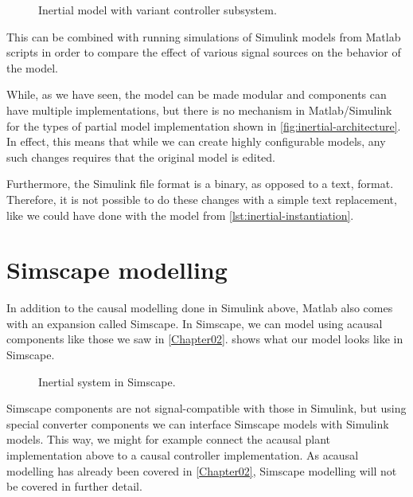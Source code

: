 \documentclass[\rootfolder/main.tex]{subfiles}
\begin{document}
\begin{figure}[ht]
    \centering
    {
        \footnotesize
        
    }
    {
        \footnotesize
        
    }
    \caption{Inertial model with variant controller subsystem.\label{fig:inertial-simulink-variant}}
\end{figure}

This can be combined with running simulations of Simulink models from Matlab scripts in order to compare the effect of various signal sources on the behavior of the model.

While, as we have seen, the model can be made modular and components can have multiple implementations, but there is no mechanism in Matlab/Simulink for
the types of partial model implementation shown in \cref{fig:inertial-architecture}.
In effect, this means that while we can create highly configurable models, any such changes requires that the original model is edited.

Furthermore, the Simulink file format is a binary, as opposed to a text, format.
Therefore, it is not possible to do these changes with a simple text replacement, like we could have done with the model from \cref{lst:inertial-instantiation}.

\section{Simscape modelling}

In addition to the causal modelling done in Simulink above, Matlab also comes with an expansion called Simscape.
In Simscape, we can model using acausal components like those we saw in \cref{Chapter02}.
 shows what our model looks like in Simscape.

\begin{figure}[ht]
    \caption{Inertial system in Simscape.\label{fig:inertial-simscape}}
\end{figure}

Simscape components are not signal-compatible with those in Simulink, but using special converter components we can interface Simscape models with Simulink models.
This way, we might for example connect the acausal plant implementation above to a causal controller implementation.
As acausal modelling has already been covered in \cref{Chapter02}, Simscape modelling will not be covered in further detail.
\end{document}
